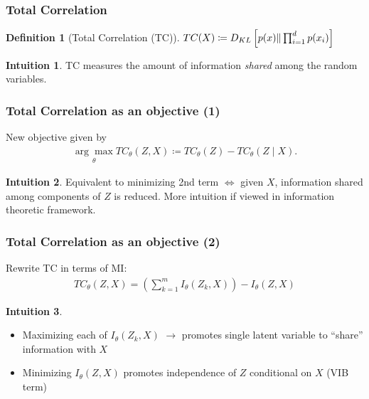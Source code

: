 \documentclass{beamer}
\theoremstyle{definition}
\newtheorem{definition}[section]{Definition}
\newtheorem{intuition}{Intuition}
\begin{document}
    \begin{frame}
      \frametitle{Total Correlation}
      \begin{definition}[Total Correlation (TC)]
        $TC(X) \coloneqq D_{KL}\left[p(x) \large  \Vert \prod_{i=1}^{d}p(x_{i})\right] $

      \end{definition}
      \begin{intuition}
        TC measures the amount of information \textit{shared} among the random variables.
      \end{intuition}
    \end{frame}

    \begin{frame}
      \frametitle{Total Correlation as an objective (1)}
      New objective given by
      \begin{align*}
        \underset{\theta}{\arg \max}TC_{\theta}(Z, X) \coloneqq TC_{\theta}(Z) - TC_{\theta}(Z \mid X).
      \end{align*}
      \begin{intuition}
        Equivalent to minimizing 2nd term $\iff$ given $X$, information shared among components of $Z$ is reduced.
        \newline
        More intuition if viewed in information theoretic framework.
      \end{intuition}
    \end{frame}

    \begin{frame}
      \frametitle{Total Correlation as an objective (2)}
      Rewrite TC in terms of MI:
      \begin{align*}
        TC_{\theta}(Z, X) = \left(\sum_{k=1}^{m}I_{\theta}(Z_{k}, X)\right) - I_{\theta}(Z, X)
      \end{align*}
      \begin{intuition}
        \begin{itemize}
          \item Maximizing each of $I_{\theta}(Z_{k}, X)$ $\to$ promotes single latent variable to \enquote{share} information with $X$
          \item Minimizing $I_{\theta}(Z, X)$ promotes independence of $Z$ conditional on $X$ (VIB term)

        \end{itemize}
      \end{intuition}
    \end{frame}
\end{document}
